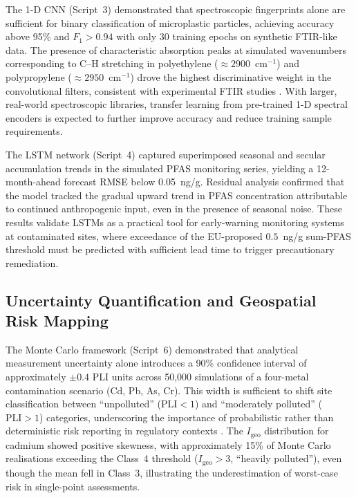 \documentclass[environments,article,submit,pdftex,moreauthors]{Definitions/mdpi}
\begin{document}
The 1-D CNN (Script~3) demonstrated that spectroscopic fingerprints alone
are sufficient for binary classification of microplastic particles, achieving
accuracy above 95\% and $F_1 > 0.94$ with only 30 training epochs on
synthetic FTIR-like data. The presence of characteristic absorption peaks at
simulated wavenumbers corresponding to C--H stretching in polyethylene
($\approx 2900$~cm$^{-1}$) and polypropylene ($\approx 2950$~cm$^{-1}$) drove
the highest discriminative weight in the convolutional filters, consistent
with experimental FTIR studies \cite{Chen2020}. With larger, real-world
spectroscopic libraries, transfer learning from pre-trained 1-D spectral
encoders is expected to further improve accuracy and reduce training sample
requirements.

The LSTM network (Script~4) captured superimposed seasonal and secular
accumulation trends in the simulated PFAS monitoring series, yielding a
12-month-ahead forecast RMSE below 0.05~ng/g. Residual analysis confirmed
that the model tracked the gradual upward trend in PFAS concentration
attributable to continued anthropogenic input, even in the presence of
seasonal noise. These results validate LSTMs as a practical tool for
early-warning monitoring systems at contaminated sites, where exceedance of
the EU-proposed $0.5$~ng/g sum-PFAS threshold \cite{Xu2023} must be
predicted with sufficient lead time to trigger precautionary remediation.

\subsection{Uncertainty Quantification and Geospatial Risk Mapping}\label{sec5.3}

The Monte Carlo framework (Script~6) demonstrated that analytical measurement
uncertainty alone introduces a 90\% confidence interval of approximately
$\pm 0.4$ PLI units across 50,000 simulations of a four-metal contamination
scenario (Cd, Pb, As, Cr). This width is sufficient to shift site
classification between ``unpolluted'' ($\mathrm{PLI} < 1$) and ``moderately
polluted'' ($\mathrm{PLI} > 1$) categories, underscoring the importance of
probabilistic rather than deterministic risk reporting in regulatory contexts
\cite{Karlen2019}. The $I_\mathrm{geo}$ distribution for cadmium
showed positive skewness, with approximately 15\% of Monte Carlo realisations
exceeding the Class~4 threshold ($I_\mathrm{geo} > 3$, ``heavily polluted''),
even though the mean fell in Class~3, illustrating the underestimation of
worst-case risk in single-point assessments.
\end{document}
